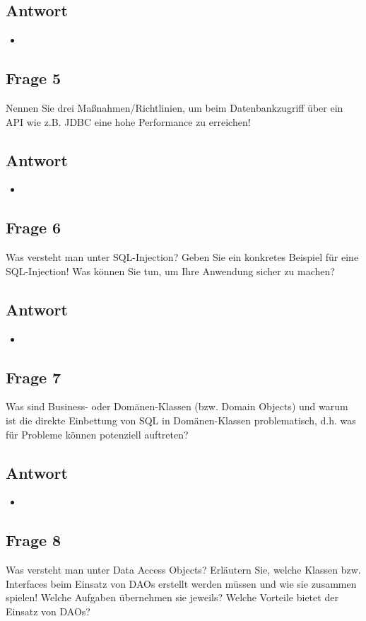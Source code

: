 \subsection*{Antwort}
\begin{itemize}
	\item 
\end{itemize}

\subsection*{Frage 5}
Nennen Sie drei Maßnahmen/Richtlinien, um beim Datenbankzugriff über ein API wie z.B. JDBC eine hohe Performance zu erreichen!
\subsection*{Antwort}
\begin{itemize}
	\item 
\end{itemize}

\subsection*{Frage 6}
Was versteht man unter SQL-Injection? Geben Sie ein konkretes Beispiel für eine SQL-Injection! Was können Sie tun, um Ihre Anwendung sicher zu machen?
\subsection*{Antwort}
\begin{itemize}
	\item 
\end{itemize}

\subsection*{Frage 7}
Was sind Business- oder Domänen-Klassen (bzw. Domain Objects) und warum ist die direkte Einbettung von SQL in Domänen-Klassen problematisch, d.h. was für Probleme können potenziell auftreten?
\subsection*{Antwort}
\begin{itemize}
	\item 
\end{itemize}

\subsection*{Frage 8}
Was versteht man unter Data Access Objects? Erläutern Sie, welche Klassen bzw. Interfaces beim Einsatz von DAOs erstellt werden müssen und wie sie zusammen spielen! Welche Aufgaben übernehmen sie jeweils? Welche Vorteile bietet der Einsatz von DAOs?
